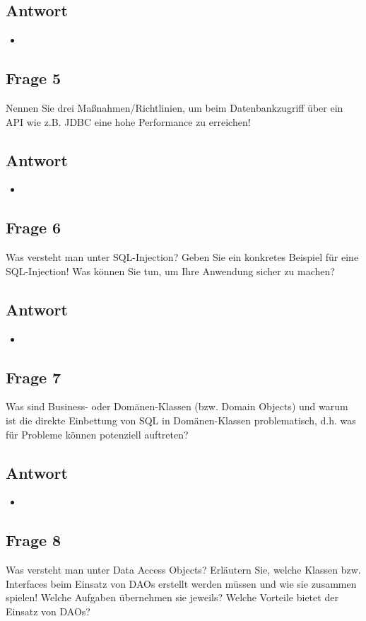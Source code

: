 \subsection*{Antwort}
\begin{itemize}
	\item 
\end{itemize}

\subsection*{Frage 5}
Nennen Sie drei Maßnahmen/Richtlinien, um beim Datenbankzugriff über ein API wie z.B. JDBC eine hohe Performance zu erreichen!
\subsection*{Antwort}
\begin{itemize}
	\item 
\end{itemize}

\subsection*{Frage 6}
Was versteht man unter SQL-Injection? Geben Sie ein konkretes Beispiel für eine SQL-Injection! Was können Sie tun, um Ihre Anwendung sicher zu machen?
\subsection*{Antwort}
\begin{itemize}
	\item 
\end{itemize}

\subsection*{Frage 7}
Was sind Business- oder Domänen-Klassen (bzw. Domain Objects) und warum ist die direkte Einbettung von SQL in Domänen-Klassen problematisch, d.h. was für Probleme können potenziell auftreten?
\subsection*{Antwort}
\begin{itemize}
	\item 
\end{itemize}

\subsection*{Frage 8}
Was versteht man unter Data Access Objects? Erläutern Sie, welche Klassen bzw. Interfaces beim Einsatz von DAOs erstellt werden müssen und wie sie zusammen spielen! Welche Aufgaben übernehmen sie jeweils? Welche Vorteile bietet der Einsatz von DAOs?
